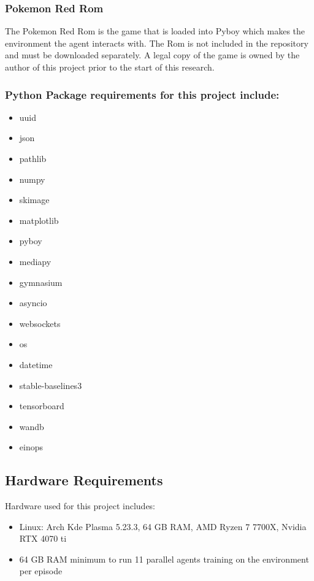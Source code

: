 \subsubsection*{Pokemon Red Rom}
The Pokemon Red Rom is the game that is loaded into Pyboy which makes the environment the agent interacts with. The Rom is not included in the repository and must be downloaded separately. A legal copy of the game is owned by the author of this project prior to the start of this research.


\subsubsection*{Python Package requirements for this project include: }

\begin{multicols}{2}
\begin{itemize}
    \item uuid
    \item json
    \item pathlib
    \item numpy
    \item skimage
    \item matplotlib
    \item pyboy
    \item mediapy
    \item gymnasium
    \item asyncio
    \item websockets
    \item os
    \item datetime
    \item stable-baselines3
    \item tensorboard
    \item wandb
    \item einops
\end{itemize}
\end{multicols}

\subsection{Hardware Requirements}

Hardware used for this project includes:
\begin{itemize}
    \item Linux: Arch Kde Plasma 5.23.3, 64 GB RAM, AMD Ryzen 7 7700X, Nvidia RTX 4070 ti
    \item 64 GB RAM minimum to run 11 parallel agents training on the environment per episode

\end{itemize}

